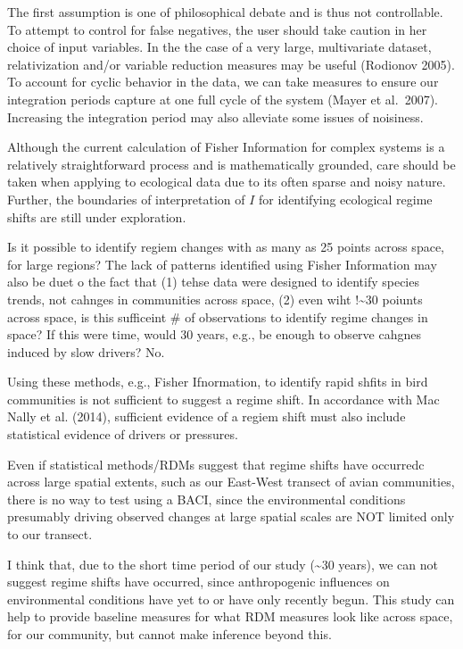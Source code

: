 \documentclass[12pt,twoside,openany]{reedthesis}
\begin{document}
The first assumption is one of philosophical debate and is thus not controllable. To attempt to control for false negatives, the user should take caution in her choice of input variables. In the the case of a very large, multivariate dataset, relativization and/or variable reduction measures may be useful (Rodionov 2005). To account for cyclic behavior in the data, we can take measures to ensure our integration periods capture at one full cycle of the system (Mayer et al.~2007). Increasing the integration period may also alleviate some issues of noisiness.

Although the current calculation of Fisher Information for complex systems is a relatively straightforward process and is mathematically grounded, care should be taken when applying to ecological data due to its often sparse and noisy nature. Further, the boundaries of interpretation of \(I\) for identifying ecological regime shifts are still under exploration.

Is it possible to identify regiem changes with as many as 25 points across space, for large regions? The lack of patterns identified using Fisher Information may also be duet o the fact that (1) tehse data were designed to identify species trends, not cahnges in communities across space, (2) even wiht !\textasciitilde{}30 poiunts across space, is this sufficeint \# of observations to identify regime changes in space? If this were time, would 30 years, e.g., be enough to observe cahgnes induced by slow drivers? No.

Using these methods, e.g., Fisher Ifnormation, to identify rapid shfits in bird communities is not sufficient to suggest a regime shift. In accordance with Mac Nally et al. (2014), sufficient evidence of a regiem shift must also include statistical evidence of drivers or pressures.

Even if statistical methods/RDMs suggest that regime shifts have occurredc across large spatial extents, such as our East-West transect of avian communities, there is no way to test using a BACI, since the environmental conditions presumably driving observed changes at large spatial scales are NOT limited only to our transect.

I think that, due to the short time period of our study (\textasciitilde{}30 years), we can not suggest regime shifts have occurred, since anthropogenic influences on environmental conditions have yet to or have only recently begun. This study can help to provide baseline measures for what RDM measures look like across space, for our community, but cannot make inference beyond this.
\end{document}
